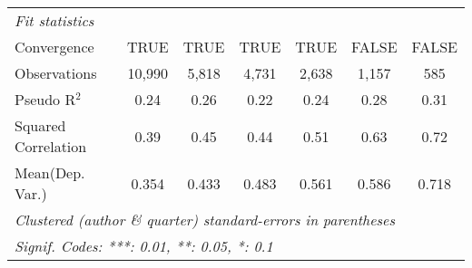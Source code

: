 \begin{tabular}{lcccccc}
   \midrule
   \emph{Fit statistics}\\
   Convergence                                                &TRUE          & TRUE    & TRUE           & TRUE           & FALSE        & FALSE\\  
   Observations                                               & 10,990       & 5,818   & 4,731          & 2,638          & 1,157        & 585\\  
   Pseudo R$^2$                                               & 0.24         & 0.26    & 0.22           & 0.24           & 0.28         & 0.31\\  
   Squared Correlation                                        & 0.39         & 0.45    & 0.44           & 0.51           & 0.63         & 0.72\\  
Mean(Dep. Var.) & 0.354 & 0.433 & 0.483 & 0.561 & 0.586 & 0.718 \\
   \midrule \midrule
   \multicolumn{7}{l}{\emph{Clustered (author \& quarter) standard-errors in parentheses}}\\
   \multicolumn{7}{l}{\emph{Signif. Codes: ***: 0.01, **: 0.05, *: 0.1}}\\
\end{tabular}
\par\endgroup
